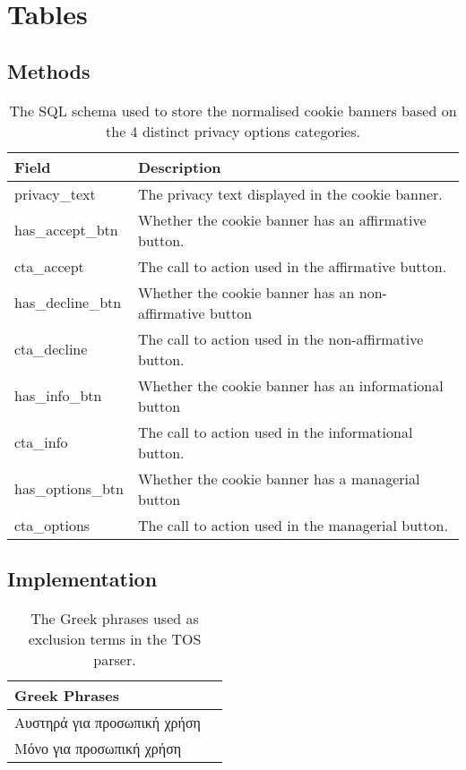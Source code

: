 \documentclass[../main.tex]{subfiles}
\begin{document}
\section{Tables}

\subsection*{Methods}
\begin{table}[ht]
    \centering
    \begin{tabular}{@{}ll@{}}
    \toprule
        \textbf{Field}    & \textbf{Description}                                    \\ \midrule
        privacy\_text     & The privacy text displayed in the cookie banner.        \\
        has\_accept\_btn  & Whether the cookie banner has an affirmative button.    \\
        cta\_accept       & The call to action used in the affirmative button.      \\
        has\_decline\_btn & Whether the cookie banner has an non-affirmative button \\
        cta\_decline      & The call to action used in the non-affirmative button.  \\
        has\_info\_btn    & Whether the cookie banner has an informational button   \\
        cta\_info         & The call to action used in the informational button.    \\
        has\_options\_btn & Whether the cookie banner has a managerial button       \\
        cta\_options      & The call to action used in the managerial button.       \\ \bottomrule
    \end{tabular}
    \caption{The SQL schema used to store the normalised cookie banners based on the 4 distinct privacy options categories.}
    \label{tab:methods_normalised_schema}
\end{table}

\subsection*{Implementation}
\begin{table}[ht]
    \centering
    \begin{tabular}{@{}ll@{}}
        \toprule
        \textbf{Greek Phrases}       \\ \midrule
        Αυστηρά για προσωπική χρήση  \\
        Μόνο για προσωπική χρήση     \\ \bottomrule
    \end{tabular}
    \caption{The Greek phrases used as exclusion terms in the TOS parser.}
    \label{tab:impl_greek_exclusion_terms}
\end{table}
\end{document}
